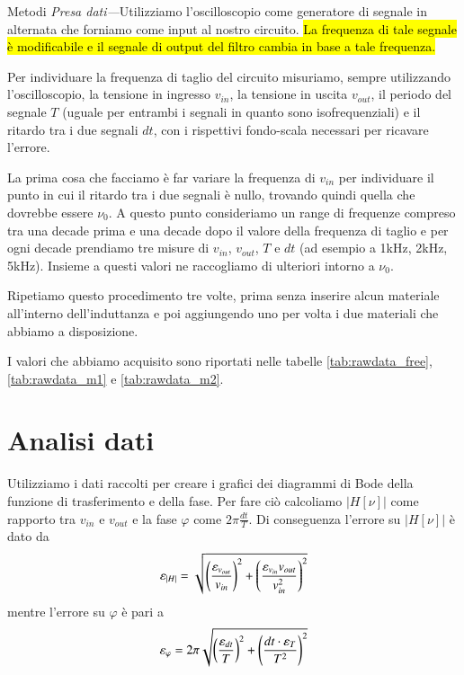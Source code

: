 \documentclass[
    rmp,
    floatfix,
    reprint, 
    superscriptaddress, 
    altaffilletter, 
    amsmath, 
    amssymb, 
    a4paper]{revtex4-2}
\begin{document}
\begin{methods}{Metodi}
    \noindent\textit{Presa dati---}Utilizziamo l'oscilloscopio come generatore di segnale in alternata che forniamo come input al nostro circuito. \hl{La frequenza di tale segnale \`e modificabile e il segnale di output del filtro cambia in base a tale frequenza.}
    
    Per individuare la frequenza di taglio del circuito misuriamo, sempre utilizzando l'oscilloscopio, la tensione in ingresso $v_{in}$, la tensione in uscita $v_{out}$, il periodo del segnale $T$ (uguale per entrambi i segnali in quanto sono isofrequenziali) e il ritardo tra i due segnali $dt$, con i rispettivi fondo-scala necessari per ricavare l'errore. 

    La prima cosa che facciamo è far variare la frequenza di $v_{in}$ per individuare il punto in cui il ritardo tra i due segnali è nullo, trovando quindi quella che dovrebbe essere $\nu_{0}$. A questo punto consideriamo un range di frequenze compreso tra una decade prima e una decade dopo il valore della frequenza di taglio e per ogni decade prendiamo tre misure di $v_{in}$, $v_{out}$, $T$ e $dt$ (ad esempio a 1kHz, 2kHz, 5kHz). Insieme a questi valori ne raccogliamo di ulteriori intorno a $\nu_{0}$.

    Ripetiamo questo procedimento tre volte, prima senza inserire alcun materiale all'interno dell'induttanza e poi aggiungendo uno per volta i due materiali che abbiamo a disposizione.
    
    I valori che abbiamo acquisito sono riportati nelle tabelle \ref{tab:rawdata_free}, \ref{tab:rawdata_m1} e \ref{tab:rawdata_m2}.
        
\end{methods}

\section*{Analisi dati}
Utilizziamo i dati raccolti per creare i grafici dei diagrammi di Bode della funzione di trasferimento e della fase. Per fare ciò calcoliamo $\big|H[\nu]\big|$ come rapporto tra $v_{in}$ e $v_{out}$ e la fase $\varphi$ come $2\pi\frac{dt}{T}$. Di conseguenza l'errore su $\big|H[\nu]\big|$ è dato da \[\varepsilon_{|H|}=\sqrt{\left(\frac{\varepsilon_{v_{out}}}{v_{in}}\right)^2+\left(\frac{\varepsilon_{v_{in}}v_{out}}{v_{in}^2}\right)^2}\] mentre l'errore su $\varphi$ è pari a \[\varepsilon_{\varphi}=2\pi\sqrt{\left(\frac{\varepsilon_{dt}}{T}\right)^2 + \left(\frac{dt\cdot\varepsilon_{T}}{T^2}\right)^2}\] 
\end{document}
